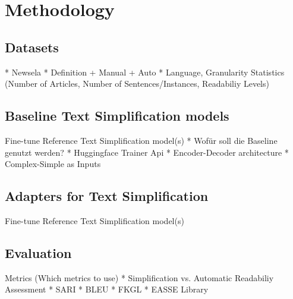 \section{Methodology}
\subsection{Datasets}
* Newsela
* Definition + Manual + Auto
* Language, Granularity
Statistics (Number of Articles, Number of Sentences/Instances, Readabiliy Levels)


\subsection{Baseline Text Simplification models}
Fine-tune Reference Text Simplification model(s)
* Wofür soll die Baseline genutzt werden?
* Huggingface Trainer Api
* Encoder-Decoder architecture
* Complex-Simple as Inputs



\subsection{Adapters for Text Simplification}
Fine-tune Reference Text Simplification model(s)
\subsection{Evaluation}
Metrics (Which metrics to use)
* Simplification vs. Automatic Readabiliy Assessment
* SARI
* BLEU
* FKGL
* EASSE Library